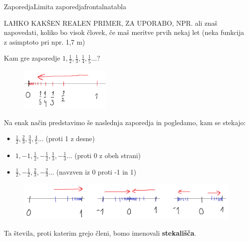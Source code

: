 \begin{priprava}{}{}{Zaporedja}{Limita zaporedja}{frontalna}{tabla}

LAHKO KAKŠEN REALEN PRIMER, ZA UPORABO, NPR. ali znaš napovedati, koliko bo visok človek, če maš meritve prvih nekaj let (neka funkcija z asimptoto pri npr. 1,7 m)

 Kam gre zaporedje $ 1, \frac{1}{2}, \frac{1}{3}, \frac{1}{4},\frac{1}{5} \ldots $? 


\begin{figure}[h]
    \centering
    \includegraphics[width=0.4\textwidth]{slike/lim1.png}
\end{figure}

Na enak način predstavimo še naslednja zaporedja in pogledamo, kam se stekajo:
\begin{itemize}
    \item $ \frac{1}{2}, \frac{2}{3}, \frac{3}{4}, \frac{4}{5} \ldots $  (proti 1 z desne)
    \item $ 1, -1, \frac{1}{2}, -\frac{1}{2}, \frac{1}{3}, -\frac{1}{3} \ldots $ (proti 0 z obeh strani)
    \item $ \frac{1}{2}, -\frac{1}{2}, \frac{2}{3}, -\frac{2}{3} \ldots $ (navzven iz 0 proti -1 in 1)
\end{itemize}

\begin{figure}[h]
    \centering
    \includegraphics[width=\textwidth]{slike/lim2.png}
\end{figure}

Ta števila, proti katerim grejo členi, bomo imenovali \textbf{stekališča}.


\end{priprava}
